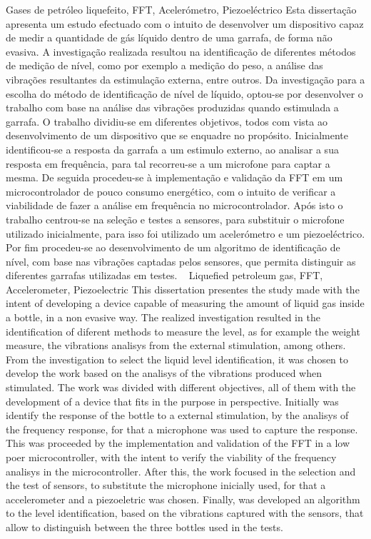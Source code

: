 \TitlePage
  \vspace*{55mm}
       {Gases de petróleo liquefeito, FFT, Acelerómetro, Piezoeléctrico}
       {Esta dissertação apresenta um estudo efectuado com o intuito de desenvolver um dispositivo capaz de medir a quantidade de gás líquido dentro de uma garrafa, de forma não evasiva. A investigação realizada resultou na identificação de diferentes métodos de medição de nível, como por exemplo a medição do peso, a análise das vibrações resultantes da estimulação externa, entre outros. Da investigação para a escolha do método de identificação de nível de líquido, optou-se por desenvolver o trabalho com base na análise das vibrações produzidas quando estimulada a garrafa.}
  \TEXT{}
       {O trabalho dividiu-se em diferentes objetivos, todos com vista ao desenvolvimento de um dispositivo que se enquadre no propósito. Inicialmente identificou-se a resposta da garrafa a um estimulo externo, ao analisar a sua resposta em frequência, para tal recorreu-se a um microfone para captar a mesma. De seguida procedeu-se à implementação e validação da FFT em um microcontrolador de pouco consumo energético, com o intuito de verificar a viabilidade de fazer a análise em frequência no microcontrolador. Após isto o trabalho centrou-se na seleção e testes a sensores, para substituir o microfone utilizado inicialmente, para isso foi utilizado um acelerómetro e um piezoeléctrico. Por fim procedeu-se ao desenvolvimento de um algoritmo de identificação de nível, com base nas vibrações captadas pelos sensores, que permita distinguir as diferentes garrafas utilizadas em testes.} 
\EndTitlePage
\titlepage\ \endtitlepage %
\TitlePage
  \vspace*{55mm}
       {Liquefied petroleum gas, FFT, Accelerometer, Piezoelectric}
       {This dissertation presentes the study made with the intent of developing a device capable of measuring the amount of liquid gas inside a bottle, in a non evasive way. The realized investigation resulted in the identification of diferent methods to measure the level, as for example the weight measure, the vibrations analisys from the external stimulation, among others. From the investigation to select the liquid level identification, it was chosen to develop the work based on the analisys of the vibrations produced when stimulated.}
  \TEXT{}
       {The work was divided with different objectives, all of them with the development of a device that fits in the purpose in perspective. Initially was identify the response of the bottle to a external stimulation, by the analisys of the frequency response, for that a microphone was used to capture the response. This was proceeded by the implementation and validation of the FFT in a low poer microcontroller, with the intent to verify the viability of the frequency analisys in the microcontroller. After this, the work focused in the selection and the test of sensors, to substitute the microphone inicially used, for that a accelerometer and a piezoeletric was chosen. Finally, was developed an algorithm to the level identification, based on the vibrations captured with the sensors, that allow to distinguish between the three bottles used in the tests.}
\EndTitlePage
\titlepage\ \endtitlepage %
